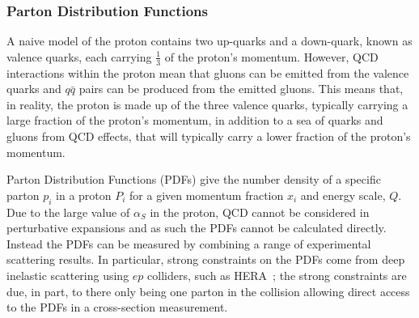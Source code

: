 
\subsubsection{Parton Distribution Functions}
\label{sec:theo-qcd_pdf}

A naive model of the proton contains two up-quarks and a down-quark,
known as valence quarks, each carrying $\frac{1}{3}$ of the proton's momentum.
However, QCD interactions within the proton mean that gluons can be emitted from the valence quarks
and $q\bar{q}$ pairs can be produced from the emitted gluons.
This means that, in reality, the proton is made up of the three valence quarks, typically carrying a large fraction of the proton's momentum,
in addition to a sea of quarks and gluons from QCD effects, that will typically carry a lower fraction of the proton's momentum.

Parton Distribution Functions (PDFs) give the number density of a specific parton $p_i$ in a proton $P_i$
for a given momentum fraction $x_i$ and energy scale, $Q$.
Due to the large value of $\alpha_S$ in the proton, QCD cannot be considered in perturbative expansions and as such the PDFs cannot be calculated directly.
Instead the PDFs can be measured by combining a range of experimental scattering results.
In particular, strong constraints on the PDFs come from deep inelastic scattering using $ep$ colliders, such as HERA~\cite{theo-qcd_hera};
the strong constraints are due, in part, to there only being one parton in the collision allowing direct access to the PDFs in a cross-section measurement.


